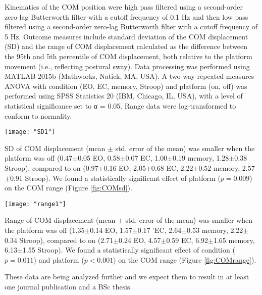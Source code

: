 Kinematics of the COM position were high pass filtered using a second-order zero-lag Butterworth filter with a cutoff frequency of 0.1 Hz and then low pass filtered using a second-order zero-lag Butterworth filter with a cutoff frequency of 5 Hz. Outcome measures include standard deviation of the COM displacement (SD) and the range of COM displacement calculated as the difference between the 95th and 5th percentile of COM displacement, both relative to the platform movement (i.e., reflecting postural sway).
Data processing was performed using MATLAB 2015b (Mathworks, Natick, MA, USA). A two-way repeated measures ANOVA with condition (EO, EC, memory, Stroop) and platform (on, off) was performed using SPSS Statistics 20 (IBM, Chicago, IL, USA), with a level of statistical significance set to α = 0.05. Range data were log-transformed to conform to normality.

\begin{figure*}[!ht]
	\centering
	\texttt{[image: "SD1"]}
	\caption{SD of the COM displacement (mm).}
	\label{fig:COMsd}
\end{figure*}

SD of COM displacement (mean $\pm$ std. error of the mean) was smaller when the platform was off (0.47$\pm$0.05 EO, 0.58$\pm$0.07 EC, 1.00$\pm$0.19 memory, 1.28$\pm$0.38 Stroop), compared to on (0.97$\pm$0.16 EO, 2.05$\pm$0.68 EC, 2.22$\pm$0.52 memory, 2.57$\pm$0.91 Stroop). We found a statistically significant effect of platform ($p = 0.009$) on the COM range (Figure \ref{fig:COMsd}).

\begin{figure*}[!ht]
	\centering
	\texttt{[image: "range1"]}
	\caption{Range of the COM displacement (mm).}
	\label{fig:COMrange}
\end{figure*}

Range of COM displacement (mean $\pm$ std. error of the mean) was smaller when the platform was off (1.35$\pm$0.14 EO, 1.57$\pm$0.17 'EC, 2.64$\pm$0.53 memory, 2.22$\pm$0.34 Stroop), compared to on (2.71$\pm$0.24 EO, 4.57$\pm$0.59 EC, 6.92$\pm$1.65 memory, 6.13$\pm$1.55 Stroop). We found a statistically significant effect of condition ($p = 0.011$) and platform ($p < 0.001$) on the COM range (Figure \ref{fig:COMrange}).

These data are being analyzed further and we expect them to result in at least one journal publication and a BSc thesis.